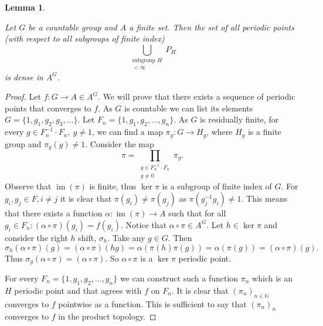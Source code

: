 \documentclass[titlepage, a4paper]{article}
\newcommand{\N}{\mathbb{N}}
\DeclareMathOperator{\im}{im}
\newtheorem{lemma}[theorem]{Lemma}
\theoremstyle{remark}
\begin{document}
    \begin{lemma} \label{lem:h-periodic_points}
    
    Let $G$ be a countable group and $A$ a finite set. Then the set of all periodic points (with respect to all subgroups of finite index)
    \[
    \bigcup_{\substack{\text{subgroup } H \\ [G : H] < \infty}} P_H
    \]
     is dense in $A^G$.
    \end{lemma}
    \begin{proof}
        Let $f:G \to A \in A^G$. We will prove that there exists a sequence of periodic points that converges to $f$. As $G$ is countable we can list its elements $G = \{1, g_1, g_2, g_3,\dots\}$. 
        Let $F_n = \{1, g_1, g_2, \dots, g_n\}$. 
        As $G$ is residually finite, for every $g \in F_n^{-1} \cdot F_n,\ g \ne 1$, we can find a map $\pi_g: G \to H_g$, where $H_g$ is a finite group and $\pi_g(g) \ne 1$.  Consider the map \[\pi = \prod_{ \substack{g\in  F_n^{-1} \cdot F_n\\ g\ne 0}} \pi_g
        .\]
        Observe that $\im(\pi)$ is finite, thus $\ker\pi$ is a subgroup of finite index of $G$. 
        For $g_i, g_j \in F, i \ne j$ it is clear that $\pi(g_i) \ne \pi(g_j)$ as $\pi(g_j^{-1} g_i) \ne 1$. 
        This means that there exists a function $\alpha: \im(\pi) \to A$ such that for all $g_i \in F_n: (\alpha \circ \pi)(g_i) = f(g_i)$.
        Notice that $\alpha \circ \pi \in A^G$. 
        Let $h \in \ker\pi$ and consider the right $h$ shift, $\sigma_h$. 
        Take any $g \in G$. 
        Then 
        \[\sigma_h(\alpha\circ\pi)(g) = (\alpha \circ \pi)(hg) = \alpha(\pi(h)\pi(g)) = \alpha(\pi(g)) = (\alpha\circ\pi)(g).\] Thus $\sigma_g(\alpha \circ \pi) = (\alpha\circ\pi)$.
        So $\alpha\circ\pi$ is a $\ker\pi$ periodic point. 

	For every $F_n =  \{1, g_1, g_2, \dots, g_n\}$ we can construct such a function $\pi_n$ which is an $H$ periodic point 
        and that agrees with $f$ on $F_n$. It is clear that $(\pi_n)_{n\in\N}$ converges to $f$ pointwise as a function. This is sufficient to say that $(\pi_n)_n$ converges to $f$ in the product topology.
    \end{proof}
\end{document}
